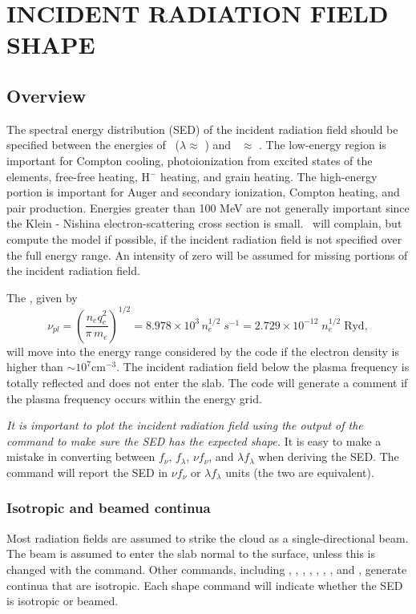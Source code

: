 \chapter{INCIDENT RADIATION FIELD SHAPE}
\label{sec:IncidentContinuumShape}

\section{Overview}

The spectral energy distribution (SED) of the
incident radiation field should be specified
between the energies of \emm\ ($\lambda \approx$ \emmcm )
and \egamrymev \ $\approx$ \egamry .
The low-energy region is important for Compton cooling,
photoionization
from excited states of the elements, free-free heating, H$^-$ heating,
and grain heating.
The high-energy portion is important for Auger and secondary
ionization, Compton heating, and pair production.
Energies greater than
100 MeV are not generally important since the Klein - Nishina
electron-scattering cross section is small.
\Cloudy\ will complain, but compute
the model if possible, if the
incident radiation field is not specified over the full energy range.
An intensity of zero will be assumed for missing portions of the
incident radiation field.

The , given by
\begin{equation}
\nu _{pl}  = \left( {\frac{{n_e q_e^2 }}{{\pi \,m_e }}} \right)^{1/2}  =
8.978 \times 10^3 \,n_e^{1/2} \;s^{ - 1}  = 2.729 \times 10^{ - 12}
\;n_e^{1/2} \;{\mathrm{Ryd}},%
\end{equation}
will move into the energy range considered by the code if the electron
density is higher than $\sim 10^7 \mathrm{cm}^{-3}$.
The incident radiation field below the
plasma frequency is totally reflected and does not enter the slab.
The code will generate a comment if the plasma frequency occurs within
the energy grid.

\emph{It is important to plot the incident radiation
field using the output of the
 command to make sure the SED has the expected shape.}
It is easy to make a mistake in converting between $f_\nu$, $f_\lambda$,
$\nu f_\nu$, and $\lambda f_\lambda$ when deriving the SED.
The  command will report the SED in 
$\nu f_\nu$ or $\lambda f_\lambda$ units (the two are equivalent).

\subsection{Isotropic and beamed continua}
Most radiation fields are assumed to strike the cloud as a
single-directional beam.
The beam is assumed to enter the slab normal to
the surface, unless this is changed with the
 command.
Other commands, including
, , ,
, ,
, , and ,
generate continua that are isotropic.
Each shape command will indicate whether the SED is isotropic or beamed.

